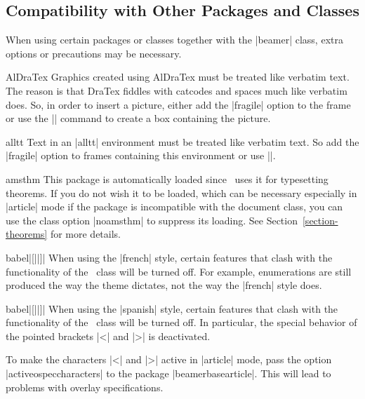 %
%
%


\subsection{Compatibility with Other Packages and Classes}

When using certain packages or classes together with the |beamer| class, extra options or precautions may be necessary.

\begin{package}{{AlDraTex}}
  Graphics created using AlDraTex must be treated like verbatim text. The reason is that DraTex fiddles with catcodes and spaces much like verbatim does. So, in order to insert a picture, either add the |fragile| option to the frame or use the || command to create a box containing the picture.
\end{package}

\begin{package}{{alltt}}
  Text in an |alltt| environment must be treated like verbatim text. So add the |fragile| option to frames containing this environment or use ||.
\end{package}

\begin{package}{{amsthm}}
  This package is automatically loaded since \beamer\ uses it for typesetting theorems. If you do not wish it to be loaded, which can be necessary especially in |article| mode if the package is incompatible with the document class, you can use the class option |noamsthm| to suppress its loading. See Section~\ref{section-theorems} for more details.
\end{package}

\begin{package}{{babel}|[||]|}
  When using the |french| style, certain features that clash with the functionality of the \beamer\ class will be turned off. For example, enumerations are still produced the way the theme dictates, not the way the |french| style does.
\end{package}

\begin{package}{{babel}|[||]|}
  \beamernote
  When using the |spanish| style, certain features that clash with the functionality of the \beamer\ class will be turned off. In particular, the special behavior of the pointed brackets |<| and |>| is deactivated.

  \articlenote
  To make the characters |<| and |>| active in |article| mode, pass the option |activeospeccharacters| to the package |beamerbasearticle|. This will lead to problems with overlay specifications.
\end{package}

